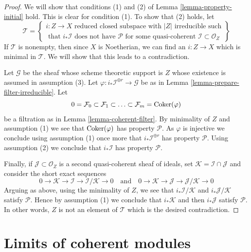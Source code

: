 \begin{proof}
We will show that conditions (1) and (2) of
Lemma \ref{lemma-property-initial} hold. This is clear for condition (1).
To show that (2) holds, let
$$
\mathcal{T} =
\left\{
\begin{matrix}
i : Z \to X \text{ reduced closed subspace with }|Z|\text{ irreducible such}\\
\text{ that }i_*\mathcal{I}\text{ does not have }\mathcal{P}
\text{ for some quasi-coherent }\mathcal{I} \subset \mathcal{O}_Z
\end{matrix}
\right\}
$$
If $\mathcal{T}$ is nonempty, then since $X$ is Noetherian, we can
find an $i : Z \to X$ which is minimal in $\mathcal{T}$. We will show
that this leads to a contradiction.

\medskip\noindent
Let $\mathcal{G}$ be the sheaf whose scheme theoretic support is $Z$ whose
existence is assumed in assumption (3). Let
$\varphi : i_*\mathcal{I}^{\oplus r} \to \mathcal{G}$ be as in
Lemma \ref{lemma-prepare-filter-irreducible}. Let
$$
0 = \mathcal{F}_0 \subset \mathcal{F}_1 \subset
\ldots \subset \mathcal{F}_m = \mathop{\mathrm{Coker}}(\varphi)
$$
be a filtration as in Lemma \ref{lemma-coherent-filter}. By minimality
of $Z$ and assumption (1) we see that $\mathop{\mathrm{Coker}}(\varphi)$ has
property $\mathcal{P}$. As $\varphi$ is injective we conclude using
assumption (1) once more that $i_*\mathcal{I}^{\oplus r}$ has property
$\mathcal{P}$. Using assumption (2) we conclude that $i_*\mathcal{I}$
has property $\mathcal{P}$.

\medskip\noindent
Finally, if $\mathcal{J} \subset \mathcal{O}_Z$ is a second quasi-coherent
sheaf of ideals, set $\mathcal{K} = \mathcal{I} \cap \mathcal{J}$
and consider the short exact sequences
$$
0 \to \mathcal{K} \to \mathcal{I} \to \mathcal{I}/\mathcal{K} \to 0
\quad
\text{and}
\quad
0 \to \mathcal{K} \to \mathcal{J} \to \mathcal{J}/\mathcal{K} \to 0
$$
Arguing as above, using the minimality of $Z$, we see that
$i_*\mathcal{I}/\mathcal{K}$ and $i_*\mathcal{J}/\mathcal{K}$
satisfy $\mathcal{P}$. Hence by assumption (1) we conclude that
$i_*\mathcal{K}$ and then $i_*\mathcal{J}$ satisfy $\mathcal{P}$.
In other words, $Z$ is not an element of $\mathcal{T}$ which is
the desired contradiction.
\end{proof}






\section{Limits of coherent modules}
\label{section-limits}

